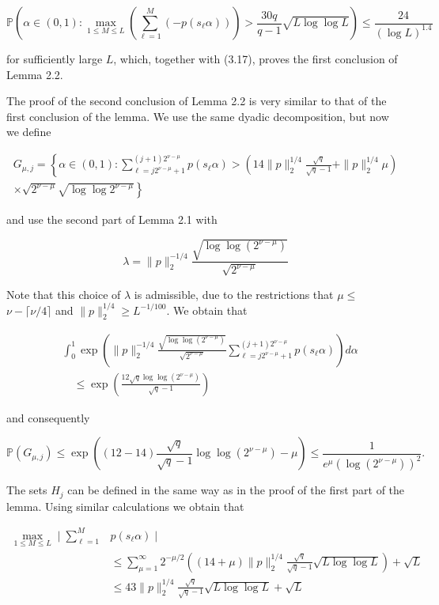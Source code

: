 \documentclass[10pt]{article}
\newcommand{\1}{\mathbf{1}}
\begin{document}
$$
\mathbb{P}\left(\alpha \in(0,1): \max _{1 \leqslant M \leqslant L}\left(\sum_{\ell=1}^{M}\left(-p\left(s_{\ell} \alpha\right)\right)\right)>\frac{30q}{q-1} \sqrt{L \log \log L}\right) \leqslant \frac{24}{(\log L)^{1.4}}
$$

for sufficiently large $L$, which, together with (3.17), proves the first conclusion of Lemma 2.2.

The proof of the second conclusion of Lemma 2.2 is very similar to that of the first conclusion of the lemma. We use the same dyadic decomposition, but now we define

$$
\begin{array}{r}
G_{\mu, j}=\left\{\alpha \in(0,1): \sum_{\ell=j 2^{\nu-\mu}+1}^{(j+1) 2^{\nu-\mu}} p\left(s_{\ell} \alpha\right)>\left(14\|p\|_{2}^{1 / 4} \frac{\sqrt{q}}{\sqrt{q}-1}+\|p\|_{2}^{1 / 4} \mu\right)\right. \\
\left.\times \sqrt{2^{\nu-\mu}} \sqrt{\log \log 2^{\nu-\mu}}\right\}
\end{array}
$$

and use the second part of Lemma 2.1 with

$$
\lambda=\|p\|_{2}^{-1 / 4} \frac{\sqrt{\log \log \left(2^{\nu-\mu}\right)}}{\sqrt{2^{\nu-\mu}}}
$$

Note that this choice of $\lambda$ is admissible, due to the restrictions that $\mu \leqslant$ $\nu-\lceil\nu / 4\rceil$ and $\|p\|_{2}^{1 / 4} \geqslant L^{-1 / 100}$. We obtain that

$$
\begin{aligned}
& \int_{0}^{1} \exp \left(\|p\|_{2}^{-1 / 4} \frac{\sqrt{\log \log \left(2^{\nu-\mu}\right)}}{\sqrt{2^{\nu-\mu}}} \sum_{\ell=j 2^{\nu-\mu}+1}^{(j+1) 2^{\nu-\mu}} p\left(s_{\ell} \alpha\right)\right) d \alpha \\
& \quad \leqslant \exp \left(\frac{12 \sqrt{q} \log \log \left(2^{\nu-\mu}\right)}{\sqrt{q}-1}\right)
\end{aligned}
$$

and consequently

$$
\mathbb{P}\left(G_{\mu, j}\right) \leqslant \exp \left((12-14) \frac{\sqrt{q}}{\sqrt{q}-1} \log \log \left(2^{\nu-\mu}\right)-\mu\right) \leqslant \frac{1}{e^{\mu}\left(\log \left(2^{\nu-\mu}\right)\right)^{2}} .
$$

The sets $H_{j}$ can be defined in the same way as in the proof of the first part of the lemma. Using similar calculations we obtain that

$$
\begin{array}{rl}
\max_{1\leqslant M\leqslant L} \mid \sum_{\ell=1}^{M} & p\left(s_{\ell} \alpha\right) \mid \\
& \leqslant \sum_{\mu=1}^{\infty} 2^{-\mu / 2}\left((14+\mu)\|p\|_{2}^{1 / 4} \frac{\sqrt{q}}{\sqrt{q}-1} \sqrt{L \log \log L}\right)+\sqrt{L} \\
& \leqslant 43\|p\|_{2}^{1 / 4} \frac{\sqrt{q}}{\sqrt{q}-1} \sqrt{L \log \log L}+\sqrt{L}
\end{array}
$$
\end{document}
